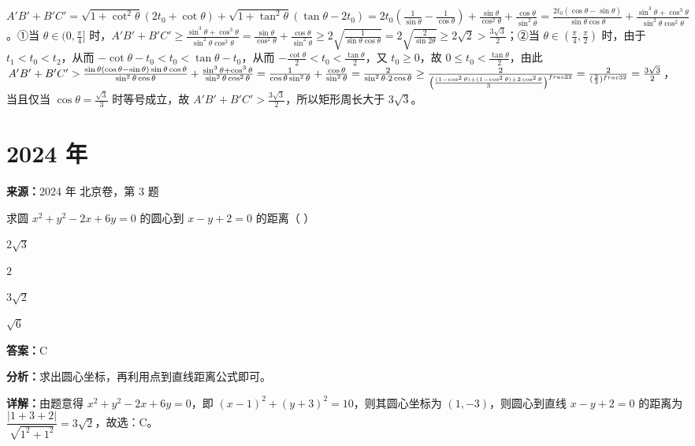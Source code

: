 \begin{question}[points=12]
\begin{solution}
$A'B'+B'C'=\sqrt{1+\cot^2\theta}(2t_0+\cot\theta)+\sqrt{1+\tan^2\theta}(\tan\theta-2t_0)=2t_0(\frac{1}{\sin\theta}-\frac{1}{\cos\theta})+\frac{\sin\theta}{\cos^2\theta}+\frac{\cos\theta}{\sin^2\theta}=\frac{2t_0(\cos\theta-\sin\theta)}{\sin\theta\cos\theta}+\frac{\sin^3\theta+\cos^3\theta}{\sin^2\theta\cos^2\theta}$。①当 $\theta\in(0,\frac{\pi}{4}]$ 时，$A'B'+B'C'\geq \frac{\sin^3\theta+\cos^3\theta}{\sin^2\theta\cos^2\theta}=\frac{\sin\theta}{\cos^2\theta}+\frac{\cos\theta}{\sin^2\theta}\geq 2\sqrt{\frac{1}{\sin\theta\cos\theta}}=2\sqrt{\frac{2}{\sin2\theta}}\geq 2\sqrt{2}>\frac{3\sqrt{3}}{2}$；②当 $\theta\in(\frac{\pi}{4},\frac{\pi}{2})$ 时，由于 $t_1<t_0<t_2$，从而 $-\cot\theta-t_0<t_0<\tan\theta-t_0$，从而 $-\frac{\cot\theta}{2}<t_0<\frac{\tan\theta}{2}$，又 $t_0\geq 0$，故 $0\leq t_0<\frac{\tan\theta}{2}$，由此 $A'B'+B'C'> \frac{\sin\theta(\cos\theta-\sin\theta)\sin\theta\cos\theta}{\sin^2\theta\cos\theta}+\frac{\sin^3\theta+\cos^3\theta}{\sin^2\theta\cos^2\theta}=\frac{1}{\cos\theta\sin^2\theta}+\frac{\cos\theta}{\sin^2\theta}=\frac{2}{\sin^2\theta\cdot2\cos\theta}\geq \frac{2}{\left(\frac{(1-\cos^2\theta)+(1-\cos^2\theta)+2\cos^2\theta}{3}\right)^{\\frac{3}{2}}}=\frac{2}{(\frac{2}{3})^{\\frac{3}{2}}}=\frac{3\sqrt{3}}{2}$，当且仅当 $\cos\theta=\frac{\sqrt{3}}{3}$ 时等号成立，故 $A'B'+B'C'>\frac{3\sqrt{3}}{2}$，所以矩形周长大于 $3\sqrt{3}$。
\end{solution}
\end{question}

\section*{2024 年}

\begin{question}[points=4]
\textbf{来源：}2024 年 北京卷，第 3 题\par
求圆 $x^2 + y^2 - 2x + 6y = 0$ 的圆心到 $x - y + 2 = 0$ 的距离（ ）
\begin{choices}
  \item $2\sqrt{3}$
  \item $2$
  \item $3\sqrt{2}$
  \item $\sqrt{6}$
\end{choices}
\begin{solution}
\textbf{答案：}C

\textbf{分析：}求出圆心坐标，再利用点到直线距离公式即可。

\textbf{详解：}由题意得 $x^2 + y^2 - 2x + 6y = 0$，即 $(x-1)^2 + (y+3)^2 = 10$，则其圆心坐标为 $(1,-3)$，则圆心到直线 $x-y+2=0$ 的距离为 $\dfrac{|1+3+2|}{\sqrt{1^2+1^2}} = 3\sqrt{2}$，故选：C。
\end{solution}
\end{question}

